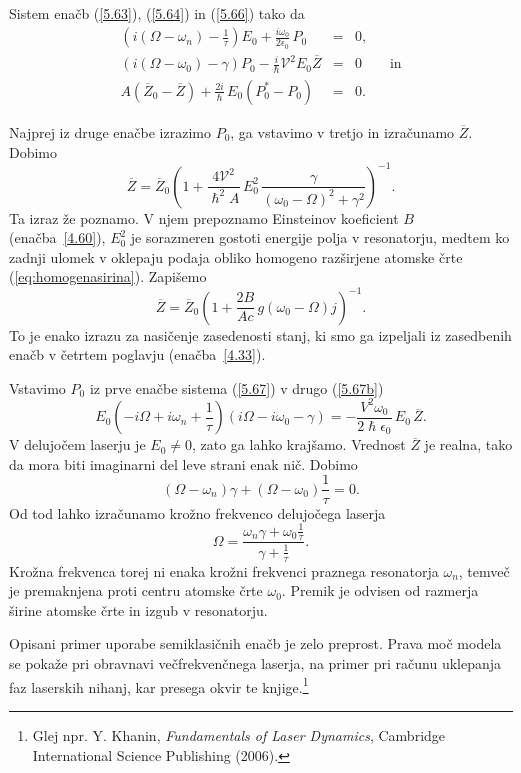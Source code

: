 Sistem enačb (\ref{5.63}), (\ref{5.64}) in (\ref{5.66}) 
tako da 
\begin{eqnarray}
\left(i\left(\Omega - \omega_n\right)-\frac{1}{\tau}\right) E_{0}+\frac{i\omega _{0}}
{2\epsilon _{0}}\,P_{0} &=&0,  \label{5.67} \\
\left(i\left(\Omega-\omega_{0}\right)-\gamma\right)P_{0}-\frac{i}{\hslash}\mathcal{V}^{2}
E_{0}\overline{Z} &=&0 \qquad \mathrm{in}\label{5.67b}\\
A\left(\overline{Z}_{0}-\overline{Z}\right)+\frac{2i}{\hslash }\,E_{0}\left(P_{0}^{*}-P_{0}\right) &=&0.
\end{eqnarray}

Najprej iz druge enačbe izrazimo $P_0$, ga vstavimo v tretjo in izračunamo $\overline{Z}$. Dobimo
\begin{equation}  
\label{5.68}
\overline{Z}=\overline{Z}_0\left(1+\frac{4\mathcal{V}^2}{\hslash^2 A}\,E_0^2\, \frac{\gamma}
{\left(\omega_0-\Omega\right)^2+\gamma^2}\right)^{-1}.
\end{equation}
Ta izraz že poznamo. V njem prepoznamo Einsteinov
koeficient $B$ (enačba~\ref{4.60}),
$E_0^2$ je sorazmeren gostoti energije polja v resonatorju, medtem ko 
zadnji ulomek v oklepaju podaja obliko homogeno razširjene atomske
črte (\ref{eq:homogenasirina}). Zapišemo
\begin{equation}  
\label{5.69}
\overline{Z}=\overline{Z}_0\left(1+\frac{2B}{Ac}\,g\left(\omega_0- \Omega\right)j\right)^{-1}.
\end{equation}
To je enako izrazu za nasičenje zasedenosti stanj, ki smo ga
izpeljali iz zasedbenih enačb v četrtem poglavju (enačba~\ref{4.33}).

Vstavimo $P_0$ iz prve enačbe sistema (\ref{5.67}) v drugo (\ref{5.67b})
\begin{equation}  
\label{5.70}
E_0\left(-i\Omega+i\omega_n+\frac{1}{\tau}\right) \left(i\Omega- i\omega_0
-\gamma\right)=-\frac{V^2 \omega_0}{2\hslash\epsilon_0}\,E_0\,\overline{Z}.
\end{equation}
V delujočem laserju je $E_0\ne 0$, zato ga lahko krajšamo. Vrednost $\overline{Z}$ je
realna, tako da mora biti imaginarni del leve strani enak nič. Dobimo
\begin{equation}  
\label{5.71}
\left(\Omega- \omega_n\right)\gamma+\left(\Omega- \omega_0\right)\frac{1}{\tau} = 0.
\end{equation}
Od tod lahko izračunamo krožno frekvenco delujočega laserja 
\begin{equation}  \label{5.72}
\Omega=\frac{\omega_n\gamma+ \omega_0\frac{1}{\tau}}{\gamma + \frac{1}{\tau}}.
\end{equation}
Krožna frekvenca torej ni enaka krožni frekvenci praznega resonatorja $\omega_n$,
temveč je premaknjena proti centru atomske črte $\omega_0$. Premik je
odvisen od razmerja širine atomske črte in izgub v resonatorju.

Opisani primer uporabe semiklasičnih enačb je zelo preprost. Prava moč
modela se pokaže pri obravnavi večfrekvenčnega laserja, na primer pri
računu uklepanja faz laserskih nihanj, kar presega okvir te 
knjige.\footnote{Glej npr. Y. Khanin, {\it Fundamentals of Laser Dynamics}, Cambridge International Science
Publishing (2006).} 
